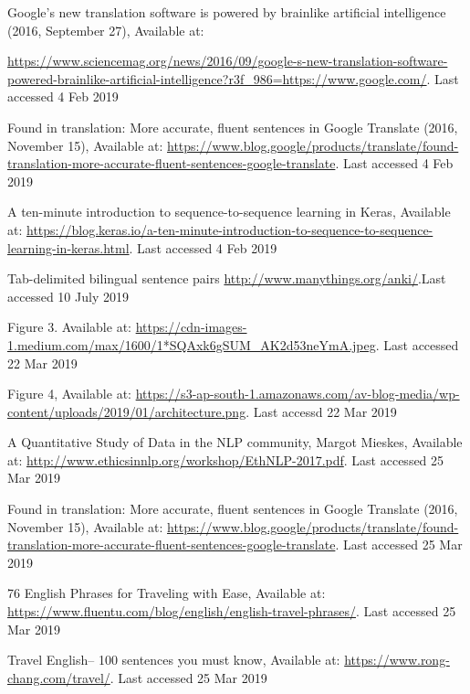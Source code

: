 \documentclass[runningheads]{llncs}
\begin{document}
\begin{thebibliography}{8}
	
	
	\sloppy
	Google’s new translation software is powered by brainlike artificial intelligence (2016, September 27), Available at:

	\url{https://www.sciencemag.org/news/2016/09/google-s-new-translation-software-powered-brainlike-artificial-intelligence?r3f\_986=https://www.google.com/}.  Last accessed 4 Feb 2019
	
	
	Found in translation: More accurate, fluent sentences in Google Translate (2016, November 15), Available at: \url{https://www.blog.google/products/translate/found-translation-more-accurate-fluent-sentences-google-translate}.  Last accessed 4 Feb 2019

	A ten-minute introduction to sequence-to-sequence learning in Keras, Available at: \url{https://blog.keras.io/a-ten-minute-introduction-to-sequence-to-sequence-learning-in-keras.html}.  Last accessed 4 Feb 2019

	Tab-delimited bilingual sentence pairs \url{http://www.manythings.org/anki/}.Last accessed  10 July 2019
		
	Figure 3. Available at: \url{https://cdn-images-1.medium.com/max/1600/1*SQAxk6gSUM_AK2d53neYmA.jpeg}. Last accessed 22 Mar 2019

	Figure 4, Available at: \url{https://s3-ap-south-1.amazonaws.com/av-blog-media/wp-content/uploads/2019/01/architecture.png}. Last accessd 22 Mar 2019
	
	A Quantitative Study of Data in the NLP community, Margot Mieskes, Available at: \url{http://www.ethicsinnlp.org/workshop/EthNLP-2017.pdf}.  Last accessed 25 Mar 2019

	Found in translation: More accurate, fluent sentences in Google Translate (2016, November 15), Available at: \url{https://www.blog.google/products/translate/found-translation-more-accurate-fluent-sentences-google-translate}.  Last accessed 25 Mar 2019

	76 English Phrases for Traveling with Ease, Available at: \url{https://www.fluentu.com/blog/english/english-travel-phrases/}.  Last accessed 25 Mar 2019

	Travel English-- 100 sentences you must know, Available at: \url{https://www.rong-chang.com/travel/}.  Last accessed 25 Mar 2019


\end{thebibliography}
\end{document}
